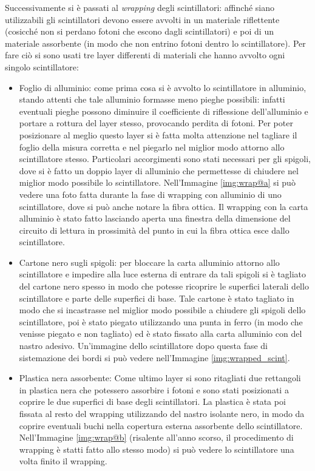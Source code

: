 Successivamente si è passati al \textit{wrapping} degli scintillatori: affinché siano utilizzabili gli scintillatori devono essere avvolti in un materiale riflettente
(cosicch\'e non si perdano fotoni che escono dagli scintillatori) e poi di un materiale assorbente (in modo che non entrino fotoni dentro lo scintillatore). Per fare
ciò si sono usati tre layer differenti di materiali che hanno avvolto ogni singolo scintillatore:
\begin{itemize}
\item Foglio di alluminio: come prima cosa si è avvolto lo scintillatore in alluminio, stando attenti che tale alluminio formasse meno pieghe possibili: infatti eventuali pieghe
possono diminuire il coefficiente di riflessione dell'alluminio e portare a rottura del layer stesso, provocando perdita di fotoni. Per poter posizionare al meglio
questo layer si è fatta molta attenzione nel tagliare il foglio della misura corretta e nel piegarlo nel miglior  modo attorno allo scintillatore stesso. Particolari
accorgimenti sono stati necessari per gli spigoli, dove si è fatto un doppio layer di alluminio che permettesse di chiudere nel miglior modo possibile lo
scintillatore. Nell'Immagine \ref{img:wrap@a} si può vedere una foto fatta durante la fase di wrapping con alluminio di uno scintillatore, dove si può anche notare la fibra
ottica. Il wrapping con la carta alluminio è stato fatto lasciando aperta una finestra della dimensione del circuito di lettura in prossimità del punto in cui la fibra
ottica esce dallo scintillatore.


\item Cartone nero sugli spigoli: per bloccare la carta alluminio attorno allo scintillatore e impedire alla luce esterna di entrare da tali spigoli si è tagliato del cartone
nero spesso in modo che potesse ricoprire le superfici laterali dello scintillatore e parte delle superfici di base. Tale cartone è stato tagliato in modo che si incastrasse
nel miglior modo possibile a chiudere gli spigoli dello scintillatore, poi è stato piegato utilizzando una punta in ferro (in modo che venisse piegato
e non tagliato) ed è stato fissato alla carta alluminio con del nastro adesivo. Un'immagine dello scintillatore dopo questa fase di sistemazione dei bordi si può vedere
nell'Immagine \ref{img:wrapped_scint}.


\item Plastica nera assorbente: Come ultimo layer si sono ritagliati due rettangoli in plastica nera che potessero assorbire i fotoni e sono stati posizionati a coprire
le due superfici di base degli scintillatori. La plastica è stata poi fissata al resto del wrapping utilizzando del nastro isolante nero, in modo da coprire eventuali buchi
nella copertura esterna assorbente dello scintillatore. Nell'Immagine \ref{img:wrap@b} (risalente all'anno scorso, il procedimento di wrapping è statti fatto
allo stesso modo) si può vedere lo scintillatore una volta finito il wrapping.


\end{itemize}
